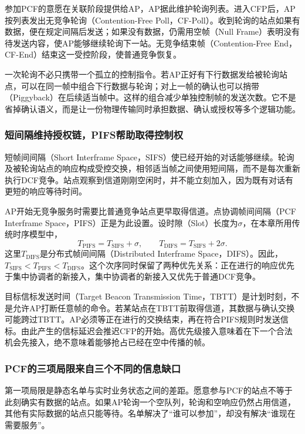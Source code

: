 参加PCF的意愿在关联阶段提供给AP，AP据此维护轮询列表。进入CFP后，AP按列表发出无竞争轮询（Contention-Free Poll，CF-Poll）。收到轮询的站点如果有数据，便在规定间隔后发送；如果没有数据，仍需用空帧（Null Frame）表明没有待发送内容，使AP能够继续轮询下一站。无竞争结束帧（Contention-Free End，CF-End）结束这一受控阶段，使普通竞争恢复。

一次轮询不必只携带一个孤立的控制指令。若AP正好有下行数据发给被轮询站点，可以在同一帧中组合下行数据与轮询；对上一帧的确认也可以捎带（Piggyback）在后续适当帧中。这样的组合减少单独控制帧的发送次数。它不是省掉确认语义，而是让一份物理传输同时承担数据、确认或授权等多个逻辑功能。

\subsubsection{短间隔维持授权链，PIFS帮助取得控制权}

短帧间间隔（Short Interframe Space，SIFS）使已经开始的对话能够继续。轮询及被轮询站点的响应构成受控交换，相邻适当帧之间使用短间隔，而不是每次重新执行DCF竞争。站点观察到信道刚刚空闲时，并不能立刻加入，因为既有对话有更短的响应等待时间。

AP开始无竞争服务时需要比普通竞争站点更早取得信道。点协调帧间间隔（PCF Interframe Space，PIFS）正是为此设置。设时隙（Slot）长度为$\sigma$，在本章所用传统时序模型中，
\begin{equation}
T_{\mathrm{PIFS}}=T_{\mathrm{SIFS}}+\sigma,
\qquad
T_{\mathrm{DIFS}}=T_{\mathrm{SIFS}}+2\sigma.
\end{equation}
这里$T_{\mathrm{DIFS}}$是分布式帧间间隔（Distributed Interframe Space，DIFS）。因此，$T_{\mathrm{SIFS}}<T_{\mathrm{PIFS}}<T_{\mathrm{DIFS}}$。这个次序同时保留了两种优先关系：正在进行的响应优先于集中协调者的新接入，集中协调者的新接入又优先于普通DCF竞争。

目标信标发送时间（Target Beacon Transmission Time，TBTT）是计划时刻，不是允许AP打断任意帧的命令。若某站点在TBTT前取得信道，其数据与确认交换可能跨过TBTT。AP必须等正在进行的交换结束，再在符合PIFS规则时发送信标。由此产生的信标延迟会推迟CFP的开始。高优先级接入意味着在下一个合法机会先接入，绝不意味着能够抢占已经在空中传播的帧。

\subsubsection{PCF的三项局限来自三个不同的信息缺口}

第一项局限是静态名单与实时业务状态之间的差距。愿意参与PCF的站点不等于此刻确实有数据的站点。如果AP轮询一个空队列，轮询和空响应仍然占用信道，其他有实际数据的站点只能等待。名单解决了“谁可以参加”，却没有解决“谁现在需要服务”。

